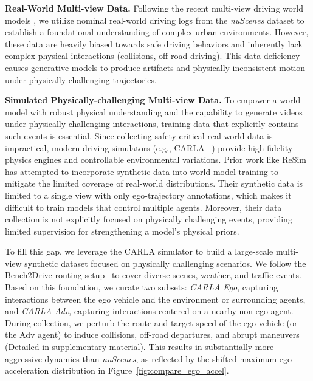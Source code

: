\documentclass[runningheads]{llncs}
\begin{document}

\textbf{Real-World Multi-view Data.} Following the recent multi-view driving world models \cite{gao2025magicdrive,zhao2025drivedreamer2}, we utilize nominal real-world driving logs from the \textit{nuScenes} dataset \cite{caesar2020nuscenes} to establish a foundational understanding of complex urban environments. However, these data are heavily biased towards safe driving behaviors and inherently lack complex physical interactions (\eg collisions, off-road driving). This data deficiency causes generative models to produce artifacts and physically inconsistent motion under physically challenging trajectories.

\setlength{\parskip}{1pt}
\noindent \textbf{Simulated Physically-challenging Multi-view Data.} To empower a world model with robust physical understanding and the capability to generate videos under physically challenging interactions, training data that explicitly contains such events is essential. Since collecting safety-critical real-world data is impractical, modern driving simulators (e.g., CARLA ~\cite{Dosovitskiy2017carla}) provide high-fidelity physics engines and controllable environmental variations. Prior work like ReSim \cite{yang2025resim} has attempted to incorporate synthetic data into world-model training to mitigate the limited coverage of real-world distributions. Their synthetic data is limited to a single view with only ego-trajectory annotations, which makes it difficult to train models that control multiple agents. Moreover, their data collection is not explicitly focused on physically challenging events, providing limited supervision for strengthening a model's physical priors. 

To fill this gap, we leverage the CARLA simulator to build a large-scale multi-view synthetic dataset focused on physically challenging scenarios. We follow the Bench2Drive routing setup~\cite{jia2024bench2drive} to cover diverse scenes, weather, and traffic events. Based on this foundation, we curate two subsets: \textit{CARLA Ego}, capturing interactions between the ego vehicle and the environment or surrounding agents, and \textit{CARLA Adv}, capturing interactions centered on a nearby non-ego agent. During collection, we perturb the route and target speed of the ego vehicle (or the Adv agent) to induce collisions, off-road departures, and abrupt maneuvers (Detailed in supplementary material). This results in substantially more aggressive dynamics than \textit{nuScenes}, as reflected by the shifted maximum ego-acceleration distribution in Figure~\ref{fig:compare_ego_accel}.
\end{document}
